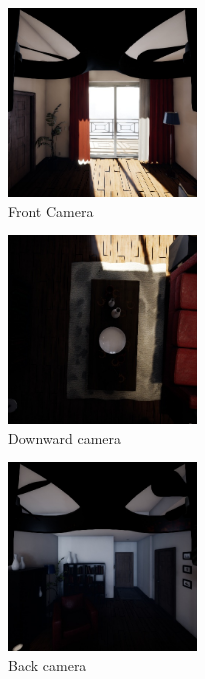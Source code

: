 \begin{figure}[!htb]
    \centering
    \begin{subfigure}{0.32\textwidth}
    \centering
        \includegraphics[height=5cm]{rapport/fig/Results/forward_center.jpeg}
        \caption{Front Camera}
        \label{fig:res_original_front}
    \end{subfigure}
    \begin{subfigure}{0.32\textwidth}
        \centering
        \includegraphics[height=5cm]{rapport/fig/Results/down_center.jpeg}
        \caption{Downward camera}
        \label{fig:res_original_down}
    \end{subfigure}    
    \begin{subfigure}{0.32\textwidth}
        \centering
        \includegraphics[height=5cm]{rapport/fig/Results/backward_center.jpeg}
        \caption{Back camera}
        \label{fig:res_original_back}
    \end{subfigure} \\[0.75ex]
    \begin{subfigure}{0.32\textwidth}

\end{subfigure}
\end{figure}

